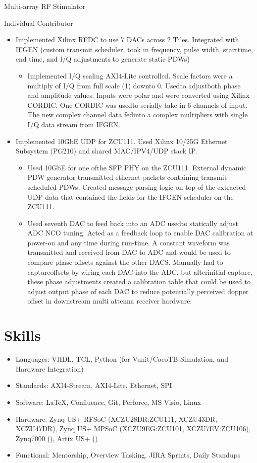 \documentclass[10pt,final,sans]{resume}
\begin{document}
  \label{RFSTIM}
  \raggedright{Multi-array RF Stimulator} \\
  \raggedright{Individual Contributor}
  \begin{itemize}
  \item Implemented Xilinx RFDC to use 7 DACs across 2 Tiles. Integrated with IFGEN (custom transmit scheduler. took in frequency, pulse width, starttime, end time, and I/Q adjustments to generate static PDWs)
    \begin{itemize}
      \item Implemented I/Q scaling AXI4-Lite controlled. Scale factors were a multiply of I/Q from full scale (1) downto 0. Usedto adjustboth phase and amplitude values. Inputs were polar and were converted using Xilinx CORDIC. One CORDIC was usedto serially take in 6 channels of input. The new complex channel data fedinto a complex multipliers with single I/Q data stream from IFGEN.
    \end{itemize}
    \item Implemented 10GbE UDP for ZCU111. Used Xilinx 10/25G Ethernet Subsystem (PG210) and shared MAC/IPV4/UDP stack IP.
    \begin{itemize}
      \item Used 10GbE for one ofthe SFP PHY on the ZCU111. External dynamic PDW generator transmitted ethernet packets containing transmit scheduled PDWs. Created message parsing logic on top of the extracted UDP data that contained the fields for the IFGEN scheduler on the ZCU111.
      \item Used seventh DAC to feed back into an ADC usedto statically adjust ADC NCO tuning. Acted as a feedback loop to enable DAC calibration at power-on and any time during run-time. A constant waveform was transmitted and received from DAC to ADC and would be used to compare phase offsets against the other DACS. Manually had to captureoffsets by wiring each DAC into the ADC, but afterinitial capture, these phase adjustments created a calibration table that could be used to adjust output phase of each DAC to reduce potentially perceived dopper offset in downstream multi attenna receiver hardware.
    \end{itemize}
  \end{itemize}


  \section{Skills}
  \begin{itemize}
    \item Languages: VHDL, TCL, Python (for Vunit/CocoTB Simulation, and Hardware Integration)
    \item Standards: AXI4-Stream, AXI4-Lite, Ethernet, SPI
    \item Software: {\textrm \LaTeX}, Confluence, Git, Perforce, MS Visio, Linux
    \item Hardware: Zynq US+ RFSoC (XCZU28DR:ZCU111, XCZU43DR, XCZU47DR), Zynq US+ MPSoC (XCZU9EG:ZCU101, XCZU7EV:ZCU106), Zynq7000 (), Artix US+ ()
    \item Functional: Mentorship, Overview Tasking, JIRA Sprints, Daily Standups
  \end{itemize}
\end{document}
